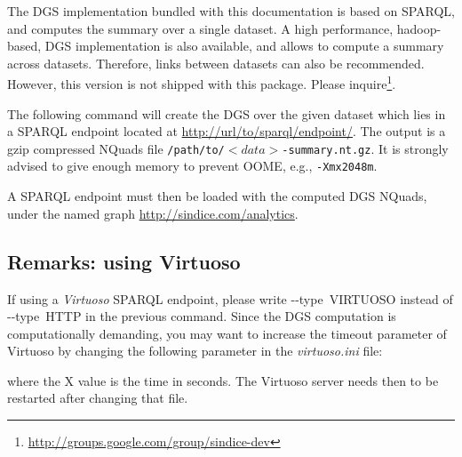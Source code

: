 
The DGS implementation bundled with this documentation is based on SPARQL, and computes the summary over a single dataset. A high performance, hadoop-based, DGS implementation is also available, and allows to compute a summary across datasets. Therefore, links between datasets can also be recommended. However, this version is not shipped with this package. Please inquire\footnote{\url{http://groups.google.com/group/sindice-dev}}.

The following command will create the DGS over the given dataset which lies in a SPARQL endpoint located at \url{http://url/to/sparql/endpoint/}. The output is a gzip compressed NQuads file \texttt{/path/to/\mbox{$<\!data\!>$}-summary.nt.gz}. It is strongly advised to give enough memory to prevent OOME, e.g., \texttt{-Xmx2048m}.

\bigskip
\begin{raggedleft}
\end{raggedleft}
\hfill

A SPARQL endpoint must then be loaded with the computed DGS NQuads, under the named graph \url{http://sindice.com/analytics}.

\subsection{Remarks: using Virtuoso}

If using a \emph{Virtuoso} SPARQL endpoint, please write \mbox{-{}-type VIRTUOSO} instead of \mbox{-{}-type HTTP} in the previous command.
Since the DGS computation is computationally demanding, you may want to increase the timeout parameter of Virtuoso by changing the following parameter in the \emph{virtuoso.ini} file:

\bigskip
\begin{raggedleft}
\end{raggedleft}
\hfill

where the X value is the time in seconds.
The Virtuoso server needs then to be restarted after changing that file.

